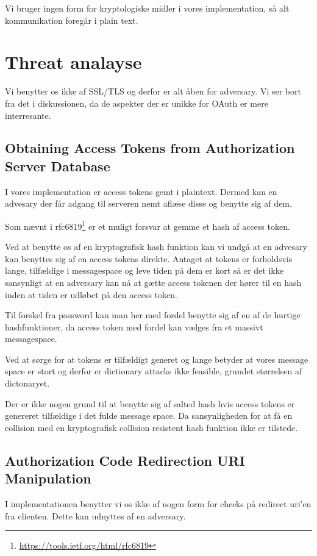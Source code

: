\documentclass[a4paper,12pt]{article}
\theoremstyle{plain}
\theoremstyle{nonumberplain}
\begin{document}
Vi bruger ingen form for kryptologiske midler i vores implementation, så alt kommunikation foregår i plain text.

\section*{Threat analayse}
Vi benytter os ikke af SSL/TLS og derfor er alt åben for adversary. Vi ser bort fra det i diskussionen, da de aspekter der er unikke for OAuth er mere interresante.

\subsection*{Obtaining Access Tokens from Authorization Server Database}
I vores implementation er access tokens gemt i plaintext. Dermed kan en advesary der får adgang til serveren nemt aflæse disse og benytte sig af dem.

Som nævnt i rfc6819\footnote{\url{https://tools.ietf.org/html/rfc6819}} er et muligt forsvar at gemme et hash af access token.

Ved at benytte os af en kryptografisk hash funktion kan vi undgå at en advesary kan benyttes sig af en access tokens direkte. Antaget at tokens er forholdsvis lange, tilfældige i messagespace og leve tiden på dem er kort så er det ikke sansynligt at en adversary kan nå at gætte access tokenen der hører til en hash inden at tiden er udløbet på den access token.

Til forskel fra password kan man her med fordel benytte sig af en af de hurtige hashfunktioner, da access token med fordel kan vælges fra et massivt messagespace.

Ved at sørge for at tokens er tilfældigt generet og lange betyder at vores message space er stort og derfor er dictionary attacks ikke feasible, grundet størrelsen af dictonaryet.

Der er ikke nogen grund til at benytte sig af salted hash hvis access tokens er genereret tilfældige i det fulde message space. Da sansynligheden for at få en collision med en kryptografisk collision resistent hash funktion ikke er tilstede.

\subsection*{Authorization Code Redirection URI Manipulation}
I implementationen benytter vi os ikke af nogen form for checks på redirect uri'en fra clienten. Dette kan udnyttes af en adversary. 
\end{document}
